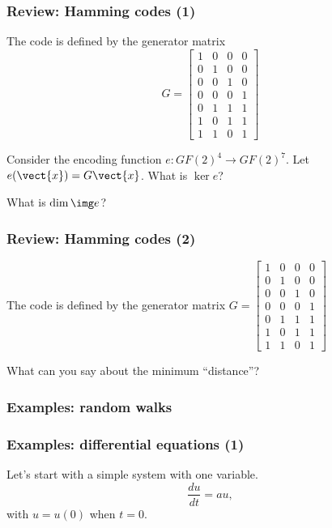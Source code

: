 

\begin{frame}
  \frametitle{Review: Hamming codes (1)}
  \pause

  The code is defined by the generator matrix
  {\tiny
    \[
    G=
    \begin{bmatrix}
      1 & 0 & 0 & 0 \\
      0 & 1 & 0 & 0 \\
      0 & 0 & 1 & 0 \\
      0 & 0 & 0 & 1 \\
      0 & 1 & 1 & 1 \\
      1 & 0 & 1 & 1 \\
      1 & 1 & 0 & 1
    \end{bmatrix}
    \]
  }
  
  Consider the encoding function $e: GF(2)^4\rightarrow GF(2)^7$.  Let
  $e(\vect{x})=G\vect{x}$.  What is $\ker e$?

  \pause

  What is $\dim \img e$?

  \vspace{1.5in}
\end{frame}

\begin{frame}
  \frametitle{Review: Hamming codes (2)}
  \pause

  The code is defined by the generator matrix
  {\tiny
    $
    G=
    \begin{bmatrix}
      1 & 0 & 0 & 0 \\
      0 & 1 & 0 & 0 \\
      0 & 0 & 1 & 0 \\
      0 & 0 & 0 & 1 \\
      0 & 1 & 1 & 1 \\
      1 & 0 & 1 & 1 \\
      1 & 1 & 0 & 1
    \end{bmatrix}
    $
  }
  
  What can you say about the minimum ``distance''?

  \vspace{2.5in}
\end{frame}

\begin{frame}
  \frametitle{Examples: random walks}
\end{frame}

\begin{frame}
  \frametitle{Examples: differential equations (1)}
  Let's start with a simple system with one variable.
  \[
  \frac{du}{dt} = au,
  \]
  with $u=u(0)$ when $t=0$.
  \vspace{2in}
\end{frame}

